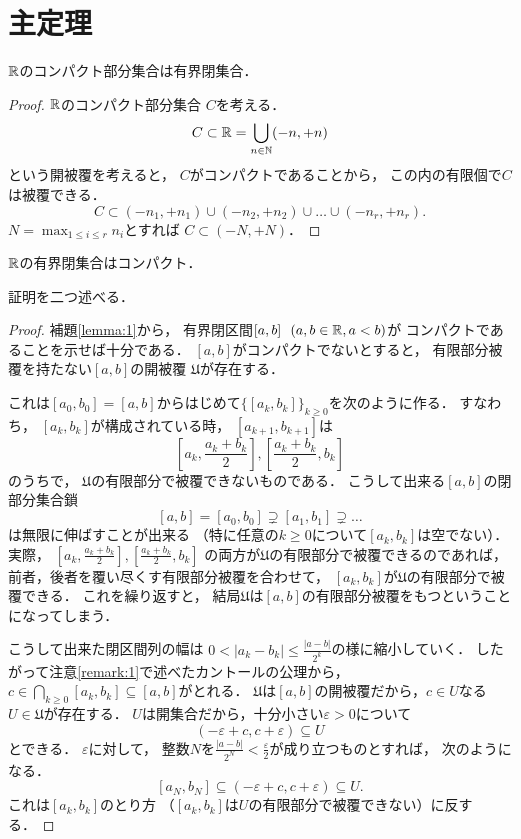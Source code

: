 \documentclass[]{jsarticle}
\newcommand{\U}{\mathfrak{U}}
\begin{document}
\section{主定理}
\begin{Thm}
    $\mathbb{R}$のコンパクト部分集合は有界閉集合．
\end{Thm}
\begin{proof}
    $\mathbb{R}$のコンパクト部分集合 $C$を考える．
    \[ C \subset \mathbb{R}=\bigcup_{n \in \mathbb{N}} (-n,+n) \]
    という開被覆を考えると，
    $C$がコンパクトであることから，
    この内の有限個で$C$は被覆できる．
    \[ C \subset (-n_1,+n_1) \cup (-n_2,+n_2) \cup \dots \cup (-n_r,+n_r). \]
    $N=\max_{1 \leq i \leq r} n_i$とすれば
    $C \subset (-N, +N)$．
\end{proof}

\begin{Thm}
    $\mathbb{R}$の有界閉集合はコンパクト．
\end{Thm}
証明を二つ述べる．
\begin{proof}
    補題\ref{lemma:1}から，
    有界閉区間$[a,b] ~~(a,b \in \mathbb{R}, a < b)$が
    コンパクトであることを示せば十分である．
    $[a,b]$がコンパクトでないとすると，
    有限部分被覆を持たない$[a,b]$の開被覆 $\U$が存在する．

    これは$[a_0,b_0]=[a,b]$からはじめて$\{[a_k, b_k]\}_{k \geq 0}$を次のように作る．
    すなわち，
    $[a_k,b_k]$が構成されている時，
    $[a_{k+1},b_{k+1}]$は
    \[
        \left[ a_k, \frac{a_k+b_k}{2} \right],
        \left[ \frac{a_k+b_k}{2}, b_k \right]
    \]
    のうちで，
    $\U$の有限部分で被覆できないものである．
    こうして出来る$[a,b]$の閉部分集合鎖
    \[ [a,b]=[a_0,b_0] \supsetneq [a_1,b_1] \supsetneq \dots \]
    は無限に伸ばすことが出来る
    （特に任意の$k \geq 0$について$[a_k,b_k]$は空でない）．
    実際，
    $\left[ a_k, \frac{a_k+b_k}{2} \right],\left[ \frac{a_k+b_k}{2}, b_k \right]$
    の両方が$\U$の有限部分で被覆できるのであれば，
    前者，後者を覆い尽くす有限部分被覆を合わせて，
    $[a_k,b_k]$が$\U$の有限部分で被覆できる．
    これを繰り返すと，
    結局$\U$は$[a,b]$の有限部分被覆をもつということになってしまう．

    こうして出来た閉区間列の幅は
    $0 < |a_k-b_k| \leq \frac{|a-b|}{2^k}$の様に縮小していく．
    したがって注意\ref{remark:1}で述べたカントールの公理から，
    $c \in \bigcap_{k \geq 0} [a_k,b_k] \subseteq [a,b]$がとれる．
    $\U$は$[a,b]$の開被覆だから，$c \in U$なる$U \in \U$が存在する．
    $U$は開集合だから，十分小さい$\varepsilon>0$について
    \[ (-\varepsilon+c, c+\varepsilon) \subseteq U \]
    とできる．
    $\varepsilon$に対して，
    整数$N$を$\frac{|a-b|}{2^N}<\frac{\varepsilon}{2}$が成り立つものとすれば，
    次のようになる．
    \[ [a_N, b_N] \subseteq (-\varepsilon+c, c+\varepsilon) \subseteq U. \]
    これは$[a_k, b_k]$のとり方
    （$[a_k, b_k]$は$U$の有限部分で被覆できない）に反する．
\end{proof}
\end{document}
